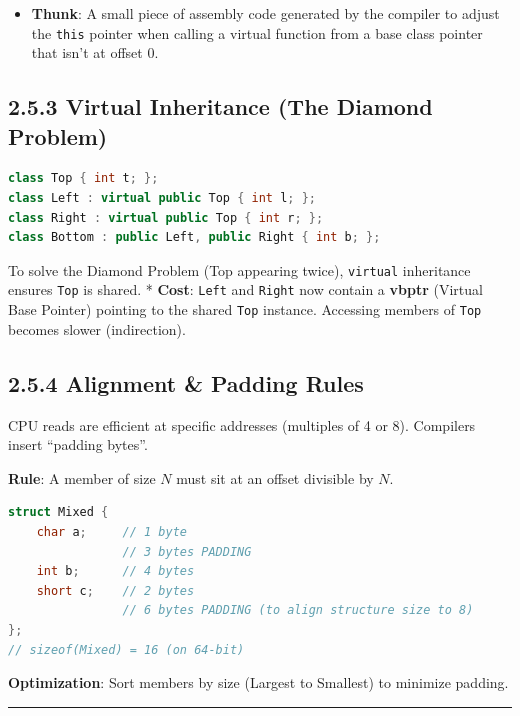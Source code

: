 \begin{itemize}
\tightlist
\item
  \textbf{Thunk}: A small piece of assembly code generated by the
  compiler to adjust the \passthrough{\lstinline!this!} pointer when
  calling a virtual function from a base class pointer that isn't at
  offset 0.
\end{itemize}

\hypertarget{virtual-inheritance-the-diamond-problem}{%
\subsection{2.5.3 Virtual Inheritance (The Diamond
Problem)}\label{virtual-inheritance-the-diamond-problem}}

\begin{lstlisting}[language={C++}]
class Top { int t; };
class Left : virtual public Top { int l; };
class Right : virtual public Top { int r; };
class Bottom : public Left, public Right { int b; };
\end{lstlisting}

To solve the Diamond Problem (Top appearing twice),
\passthrough{\lstinline!virtual!} inheritance ensures
\passthrough{\lstinline!Top!} is shared. * \textbf{Cost}:
\passthrough{\lstinline!Left!} and \passthrough{\lstinline!Right!} now
contain a \textbf{vbptr} (Virtual Base Pointer) pointing to the shared
\passthrough{\lstinline!Top!} instance. Accessing members of
\passthrough{\lstinline!Top!} becomes slower (indirection).

\hypertarget{alignment-padding-rules}{%
\subsection{2.5.4 Alignment \& Padding
Rules}\label{alignment-padding-rules}}

CPU reads are efficient at specific addresses (multiples of 4 or 8).
Compilers insert ``padding bytes''.

\textbf{Rule}: A member of size \(N\) must sit at an offset divisible by
\(N\).

\begin{lstlisting}[language={C++}]
struct Mixed {
    char a;     // 1 byte
                // 3 bytes PADDING
    int b;      // 4 bytes
    short c;    // 2 bytes
                // 6 bytes PADDING (to align structure size to 8)
};
// sizeof(Mixed) = 16 (on 64-bit)
\end{lstlisting}

\textbf{Optimization}: Sort members by size (Largest to Smallest) to
minimize padding.

\begin{center}\rule{0.5\linewidth}{0.5pt}\end{center}
